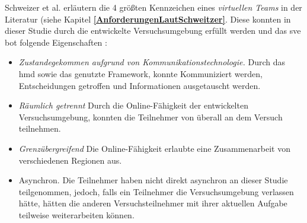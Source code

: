 \documentclass[a4paper,11pt]{article}%
\renewcommand{\\}{\vspace*{0.5\baselineskip} \newline}
\begin{document}
Schweizer et al. \citep[S.270]{schweitzer2010conceptualizing} erläutern die 4 größten Kennzeichen eines \textit{virtuellen Teams} in der Literatur (siehe Kapitel \textbf{\ref{AnforderungenLautSchweitzer}}. Diese konnten in dieser Studie durch die entwickelte Versuchsumgebung erfüllt werden und das \ac{sve} bot folgende Eigenschaften :
\begin{itemize}
\item \textit{Zustandegekommen aufgrund von Kommunikationstechnologie.} Durch das \ac{hmd} sowie das genutzte Framework, konnte Kommuniziert werden, Entscheidungen getroffen und Informationen ausgetauscht werden.
\item \textit{Räumlich getrennt} Durch die Online-Fähigkeit der entwickelten Versuchsumgebung, konnten die Teilnehmer von überall an dem Versuch teilnehmen.
\item \textit{Grenzübergreifend} Die Online-Fähigkeit erlaubte eine Zusammenarbeit von verschiedenen Regionen aus.
\item Asynchron. Die Teilnehmer haben nicht direkt asynchron an dieser Studie teilgenommen, jedoch, falls ein Teilnehmer die Versuchsumgebung verlassen hätte, hätten die anderen Versuchsteilnehmer mit ihrer aktuellen Aufgabe teilweise weiterarbeiten können.
\end{itemize}
\end{document}
